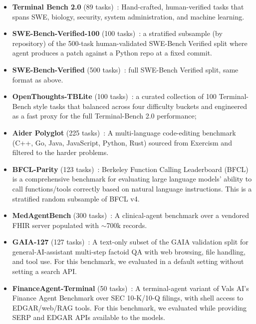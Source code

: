 \documentclass{article}
\begin{document}
\begin{itemize}
  \item \textbf{Terminal Bench 2.0} (89 tasks)~\citep{merrill2026terminalbenchbenchmarkingagentshard}:
        Hand-crafted, human-verified tasks that spans SWE, biology, security, system administration, and machine learning.
        
  \item \textbf{SWE-Bench-Verified-100} (100 tasks)~\citep{jimenez2024swebenchlanguagemodelsresolve}:
        a stratified subsample (by repository) of the 500-task human-validated SWE-Bench Verified
        split where agent produces a patch against a Python repo at a fixed commit.

  \item \textbf{SWE-Bench-Verified} (500 tasks)~\citep{jimenez2024swebenchlanguagemodelsresolve}:
        full SWE-Bench Verified split, same format as above.

  \item \textbf{OpenThoughts-TBLite} (100 tasks)~\citep{OpenThoughts-TBLite}:
        a curated collection of 100 Terminal-Bench style tasks that balanced across four
        difficulty buckets and engineered as a fast proxy for the full Terminal-Bench 2.0 performance;

  \item \textbf{Aider Polyglot} (225 tasks)~\citep{aiderpolyglot2024}:
        A multi-language code-editing benchmark (C++, Go, Java, JavaScript,
        Python, Rust) sourced from Exercism and filtered to the harder
        problems.

  \item \textbf{BFCL-Parity} (123 tasks)~\citep{patil2025bfcl}:
        Berkeley Function Calling Leaderboard (BFCL) is a comprehensive benchmark for evaluating large language models' ability to call functions/tools correctly based on natural language instructions. This is a stratified random subsample of BFCL v4.

  \item \textbf{MedAgentBench} (300 tasks)~\citep{jiang2025medagentbench}:
        A clinical-agent benchmark over a vendored FHIR server populated
        with $\sim$700k records.

  \item \textbf{GAIA-127} (127 tasks)~\citep{mialon2023gaia}:
        A text-only subset of the GAIA validation split for general-AI-assistant
        multi-step factoid QA with web browsing, file handling, and tool
        use. For this benchmark, we evaluated in a default setting without setting a search API.

  \item \textbf{FinanceAgent-Terminal} (50 tasks)~\citep{valsai2024financeagent}:
        A terminal-agent variant of Vals AI's Finance Agent Benchmark
        over SEC 10-K/10-Q filings, with shell access to EDGAR/web/RAG
        tools. For this benchmark, we evaluated while providing SERP and EDGAR APIs available to the models.
\end{itemize}
\end{document}
